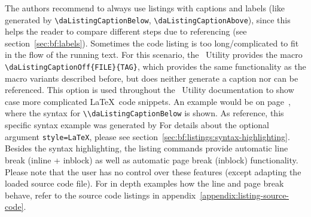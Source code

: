 		
	
	\newpage
	\lstset{style=LaTeX}
	The authors recommend to always use listings with captions and labels (like generated by \lstinline$\daListingCaptionBelow$, \lstinline$\daListingCaptionAbove$), since this helps the reader to compare different steps due to referencing (see \mbox{section \ref{sec:bf:labels}}). Sometimes the code listing is too long/complicated to fit in the flow of the running text. For this scenario, the \productName~Utility provides the macro \lstinline$\daListingCaptionOff{FILE}{TAG}$, 
	which provides the same functionality as the macro variants described before, but does neither generate a caption nor can be referenced. This option is used throughout the \productName~Utility documentation to show case more complicated \LaTeX~code snippets. An example would be on \mbox{page \pageref{lst:bf:listings:inblock:example-no-caption}}, where the syntax for \mbox{\lstinline$\\daListingCaptionBelow$} is shown. As reference, this specific syntax example was generated by
	For details about the optional argument \lstinline$style=LaTeX$, please see \mbox{section \ref{sec:bf:listings:syntax-highlighting}}.
	\newline Besides the syntax highlighting, the listing commands provide automatic line break (inline + inblock) as well as automatic page break (inblock) functionality. Please note that the user has no control over these features (except adapting the loaded source code file). For in depth examples how the line and page break behave, refer to the source code listings in \mbox{appendix \ref{appendix:listing-source-code}}.
		
	\newpage
